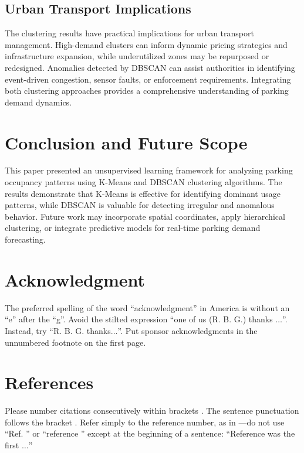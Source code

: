 \documentclass[conference]{IEEEtran}
\begin{document}
\subsection{Urban Transport Implications}

The clustering results have practical implications for urban transport management. High-demand clusters can inform dynamic pricing strategies and infrastructure expansion, while underutilized zones may be repurposed or redesigned. Anomalies detected by DBSCAN can assist authorities in identifying event-driven congestion, sensor faults, or enforcement requirements. Integrating both clustering approaches provides a comprehensive understanding of parking demand dynamics.

\section{Conclusion and Future Scope}

This paper presented an unsupervised learning framework for analyzing parking occupancy patterns using K-Means and DBSCAN clustering algorithms. The results demonstrate that K-Means is effective for identifying dominant usage patterns, while DBSCAN is valuable for detecting irregular and anomalous behavior. Future work may incorporate spatial coordinates, apply hierarchical clustering, or integrate predictive models for real-time parking demand forecasting.

\section*{Acknowledgment}

The preferred spelling of the word ``acknowledgment'' in America is without 
an ``e'' after the ``g''. Avoid the stilted expression ``one of us (R. B. 
G.) thanks $\ldots$''. Instead, try ``R. B. G. thanks$\ldots$''. Put sponsor 
acknowledgments in the unnumbered footnote on the first page.

\section*{References}

Please number citations consecutively within brackets \cite{b1}. The 
sentence punctuation follows the bracket \cite{b2}. Refer simply to the reference 
number, as in \cite{b3}---do not use ``Ref. \cite{b3}'' or ``reference \cite{b3}'' except at 
the beginning of a sentence: ``Reference \cite{b3} was the first $\ldots$''
\end{document}
